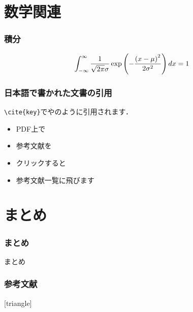 \documentclass[11pt]{beamer}
\let\oldcite=\citet
\renewcommand\citet[1]{\hyperlink{#1}{\oldcite{#1}}}
\begin{document}
\section{数学関連}
\begin{frame}
\frametitle{積分}
\begin{align}
    \int_{-\infty}^\infty \frac{1}{\sqrt{2\pi}\sigma}\exp\left(-\frac{\left(x - \mu\right)^2}{2\sigma^2}\right) dx = 1
\end{align}
\end{frame}

\begin{frame}
\frametitle{日本語で書かれた文書の引用}
\texttt{{\textbackslash}cite\{key\}}で\citet{demo}や\citet{japanese}のように引用されます．
    \begin{itemize}
        \item PDF上で
        \item 参考文献を
        \item クリックすると
        \item 参考文献一覧に飛びます
    \end{itemize}
\end{frame}

\section{まとめ}
\begin{frame}
\frametitle{まとめ}
まとめ
\end{frame}

\begin{frame}[allowframebreaks]
\frametitle{参考文献}
\begingroup
\scriptsize
    [triangle]
    
    
\endgroup
\end{frame}
\end{document}
